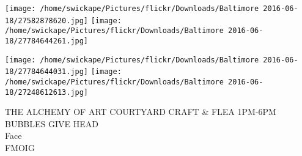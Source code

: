 \documentclass[10pt,letterpaper]{article}
\begin{document}
\texttt{[image: /home/swickape/Pictures/flickr/Downloads/Baltimore 2016-06-18/27582878620.jpg]}
\texttt{[image: /home/swickape/Pictures/flickr/Downloads/Baltimore 2016-06-18/27784644261.jpg]}

\texttt{[image: /home/swickape/Pictures/flickr/Downloads/Baltimore 2016-06-18/27784644031.jpg]}
\texttt{[image: /home/swickape/Pictures/flickr/Downloads/Baltimore 2016-06-18/27248612613.jpg]}

THE ALCHEMY OF ART COURTYARD CRAFT \& FLEA 1PM{-}6PM\\
BUBBLES GIVE HEAD\\
Face\\
FMOIG\\
\pagebreak
\end{document}
